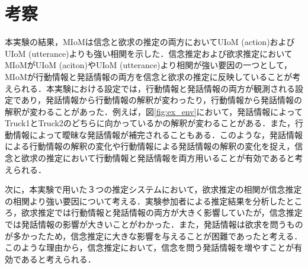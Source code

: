 \chapter{考察}
\par
本実験の結果，MIoMは信念と欲求の推定の両方においてUIoM (action)およびUIoM (utterance)よりも強い相関を示した．信念推定および欲求推定においてMIoMがUIoM (aciton)やUIoM (utterance)より相関が強い要因の一つとして，MIoMが行動情報と発話情報の両方を信念と欲求の推定に反映していることが考えられる．本実験における設定では，行動情報と発話情報の両方が観測される設定であり，発話情報から行動情報の解釈が変わったり，行動情報から発話情報の解釈が変わることがあった．例えば，図\ref{fig:ex_env}において，発話情報によってTruck1とTruck2のどちらに向かっているかの解釈が変わることがある．また，行動情報によって曖昧な発話情報が補完されることもある．このような，発話情報による行動情報の解釈の変化や行動情報による発話情報の解釈の変化を捉え，信念と欲求の推定において行動情報と発話情報を両方用いることが有効であると考えられる．

\par
次に，本実験で用いた３つの推定システムにおいて，欲求推定の相関が信念推定の相関より強い要因について考える．実験参加者による推定結果を分析したところ，欲求推定では行動情報と発話情報の両方が大きく影響していたが，信念推定では発話情報の影響が大きいことがわかった．また，発話情報は欲求を問うものが多かったため，信念推定に大きな影響を与えることが困難であったと考える．このような理由から，信念推定において，信念を問う発話情報を増やすことが有効であると考えられる．
